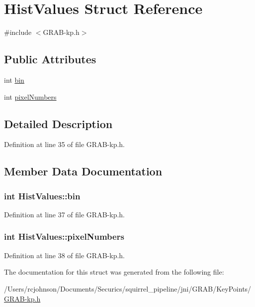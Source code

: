 \hypertarget{struct_hist_values}{\section{Hist\-Values Struct Reference}
\label{struct_hist_values}
}


{\ttfamily \#include $<$G\-R\-A\-B-\/kp.\-h$>$}

\subsection*{Public Attributes}
\begin{DoxyCompactItemize}
\item 
int \hyperlink{struct_hist_values_a9f015a6a7c2030f762490e9101804126}{bin}
\item 
int \hyperlink{struct_hist_values_a14da453af9abaf82b129c7e63d45cd57}{pixel\-Numbers}
\end{DoxyCompactItemize}


\subsection{Detailed Description}


Definition at line 35 of file G\-R\-A\-B-\/kp.\-h.



\subsection{Member Data Documentation}
\hypertarget{struct_hist_values_a9f015a6a7c2030f762490e9101804126}{
\subsubsection[{bin}]{\setlength{\rightskip}{0pt plus 5cm}int Hist\-Values\-::bin}}\label{struct_hist_values_a9f015a6a7c2030f762490e9101804126}


Definition at line 37 of file G\-R\-A\-B-\/kp.\-h.

\hypertarget{struct_hist_values_a14da453af9abaf82b129c7e63d45cd57}{
\subsubsection[{pixel\-Numbers}]{\setlength{\rightskip}{0pt plus 5cm}int Hist\-Values\-::pixel\-Numbers}}\label{struct_hist_values_a14da453af9abaf82b129c7e63d45cd57}


Definition at line 38 of file G\-R\-A\-B-\/kp.\-h.



The documentation for this struct was generated from the following file\-:\begin{DoxyCompactItemize}
\item 
/\-Users/rcjohnson/\-Documents/\-Securics/squirrel\-\_\-pipeline/jni/\-G\-R\-A\-B/\-Key\-Points/\hyperlink{_g_r_a_b-kp_8h}{G\-R\-A\-B-\/kp.\-h}\end{DoxyCompactItemize}
